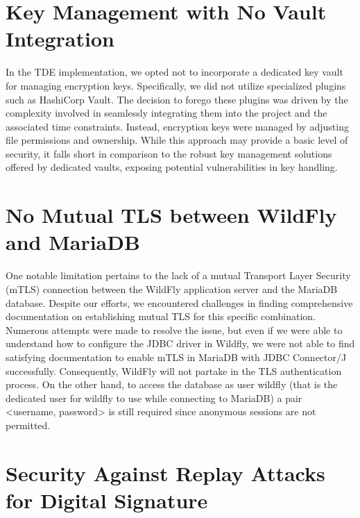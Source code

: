 \section{Key Management with No Vault Integration}

In the TDE implementation, we opted not to incorporate a dedicated key vault for managing encryption keys. Specifically, we did not utilize specialized plugins such as HashiCorp Vault. The decision to forego these plugins was driven by the complexity involved in seamlessly integrating them into the project and the associated time constraints. Instead, encryption keys were managed by adjusting file permissions and ownership. While this approach may provide a basic level of security, it falls short in comparison to the robust key management solutions offered by dedicated vaults, exposing potential vulnerabilities in key handling.

\section{No Mutual TLS between WildFly and MariaDB}

One notable limitation pertains to the lack of a mutual Transport Layer Security (mTLS) connection between the WildFly application server and the MariaDB database. Despite our efforts, we encountered challenges in finding comprehensive documentation on establishing mutual TLS for this specific combination. Numerous attempts were made to resolve the issue, but even if we were able to understand how to configure the JDBC driver in Wildfly, we were not able to find satisfying documentation to enable mTLS in MariaDB with JDBC Connector/J successfully. Consequently, WildFly will not partake in the TLS authentication process. On the other hand, to access the database as user wildfly (that is the dedicated user for wildfly to use while connecting to MariaDB) a pair <username, password> is still required since anonymous sessions are not permitted.

\section{Security Against Replay Attacks for Digital Signature}

